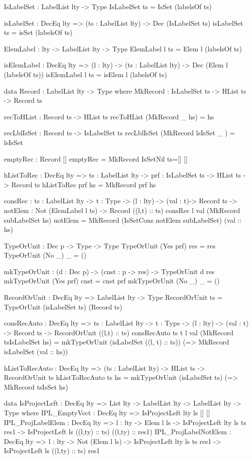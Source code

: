 \begin{code}
IsLabelSet : LabelList lty -> Type
IsLabelSet ts = IsSet (labelsOf ts)  

isLabelSet : DecEq lty => (ts : LabelList lty) -> Dec (IsLabelSet ts)
isLabelSet ts = isSet (labelsOf ts)

ElemLabel : lty -> LabelList lty -> Type
ElemLabel l ts = Elem l (labelsOf ts)

isElemLabel : DecEq lty => (l : lty) -> (ts : LabelList lty) -> 
  Dec (Elem l (labelsOf ts))
isElemLabel l ts = isElem l (labelsOf ts)

data Record : LabelList lty -> Type where
  MkRecord : IsLabelSet ts -> HList ts -> Record ts
       
recToHList : Record ts -> HList ts
recToHList (MkRecord _ hs) = hs

recLblIsSet : Record ts -> IsLabelSet ts
recLblIsSet (MkRecord lsIsSet _ ) = lsIsSet       
       
emptyRec : Record []
emptyRec = MkRecord IsSetNil {ts=[]} [] 
        
hListToRec : DecEq lty => {ts : LabelList lty} -> 
  {prf : IsLabelSet ts} -> HList ts -> Record ts
hListToRec {prf} hs = MkRecord prf hs

consRec : {ts : LabelList lty} -> {t : Type} -> 
  (l : lty) -> (val : t)->  Record ts -> 
  {notElem : Not (ElemLabel l ts)} -> Record ((l,t) :: ts)
consRec l val (MkRecord subLabelSet hs) {notElem} = 
  MkRecord (IsSetCons notElem subLabelSet) (val :: hs)

TypeOrUnit : Dec p -> Type -> Type
TypeOrUnit (Yes prf) res = res
TypeOrUnit (No _) _ = ()

mkTypeOrUnit : (d : Dec p) -> (cnst : p -> res) -> TypeOrUnit d res
mkTypeOrUnit (Yes prf) cnst = cnst prf
mkTypeOrUnit (No _) _ = ()

RecordOrUnit : DecEq lty => LabelList lty -> Type
RecordOrUnit ts = TypeOrUnit (isLabelSet ts) (Record ts)
   
consRecAuto : DecEq lty => {ts : LabelList lty} -> {t : Type} -> 
  (l : lty) -> (val : t) -> Record ts -> RecordOrUnit ((l,t) :: ts)
consRecAuto {ts} {t} l val (MkRecord tsIsLabelSet hs) = 
  mkTypeOrUnit (isLabelSet ((l, t) :: ts)) 
    (\isLabelSet => MkRecord isLabelSet (val :: hs))
    
hListToRecAuto : DecEq lty => (ts : LabelList lty) -> HList ts -> 
  RecordOrUnit ts
hListToRecAuto ts hs = mkTypeOrUnit (isLabelSet ts) 
  (\tsIsSet => MkRecord tsIsSet hs) 
        
        
data IsProjectLeft : DecEq lty => List lty -> LabelList lty -> 
  LabelList lty -> Type where
  IPL_EmptyVect : DecEq lty => IsProjectLeft {lty} ls [] []
  IPL_ProjLabelElem : DecEq lty => {l : lty} -> Elem l ls -> 
    IsProjectLeft {lty} ls ts res1 -> 
    IsProjectLeft ls ((l,ty) :: ts) ((l,ty) :: res1)      
  IPL_ProjLabelNotElem : DecEq lty => {l : lty} -> 
    Not (Elem l ls) -> IsProjectLeft {lty} ls ts res1 -> 
    IsProjectLeft ls ((l,ty) :: ts) res1


\end{code}
